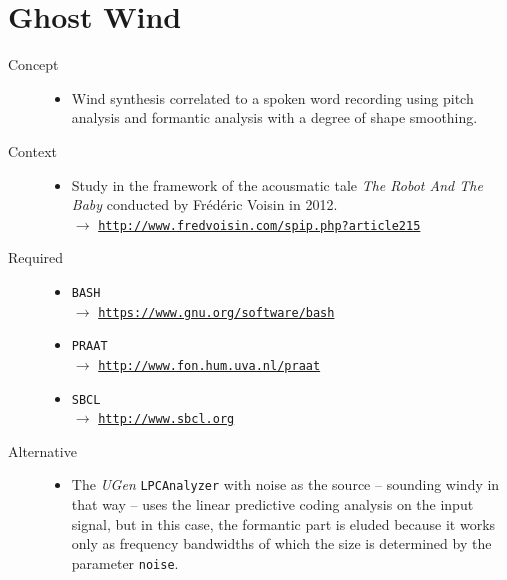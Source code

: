\section*{Ghost Wind}

\thispagestyle{empty}

\bigskip

\begin{description}
\item[Concept] \hfill 
\begin{itemize}
\item[] Wind synthesis correlated to a spoken word recording using pitch analysis and formantic analysis with a degree of shape smoothing.
\end{itemize}
\bigskip
\item[Context] \hfill 
\begin{itemize}
\item[] Study in the framework of the acousmatic tale \textit{The Robot And The Baby} conducted by Fr\'{e}d\'{e}ric Voisin in 2012. \\
$\rightarrow$ \href{http://www.fredvoisin.com/spip.php?article215}{\texttt{\small http://www.fredvoisin.com/spip.php?article215}}
\end{itemize}
\bigskip
\item[Required] \hfill 
\begin{itemize}
\setlength\itemsep{1em}
\item[] \texttt{BASH} \\ $\rightarrow$ \href{https://www.gnu.org/software/bash}{\texttt{\small https://www.gnu.org/software/bash}}
\item[] \texttt{PRAAT} \\ $\rightarrow$ \href{http://www.fon.hum.uva.nl/praat}{\texttt{\small http://www.fon.hum.uva.nl/praat}} 
\item[] \texttt{SBCL} \\ $\rightarrow$ \href{http://www.sbcl.org}{\texttt{\small http://www.sbcl.org}}
\end{itemize}
\setcounter{footnote}{0}
\item[Alternative] \hfill 
\begin{itemize}
\item[] The \textsl{UGen} \texttt{LPCAnalyzer} with noise as the source -- sounding windy in that way -- uses the linear predictive coding analysis
\citep{mak} %
on the input signal, but in this case, the formantic part is eluded because it works only as frequency bandwidths of which the size is determined by the parameter \texttt{noise}. 


\end{itemize}
\end{description}
